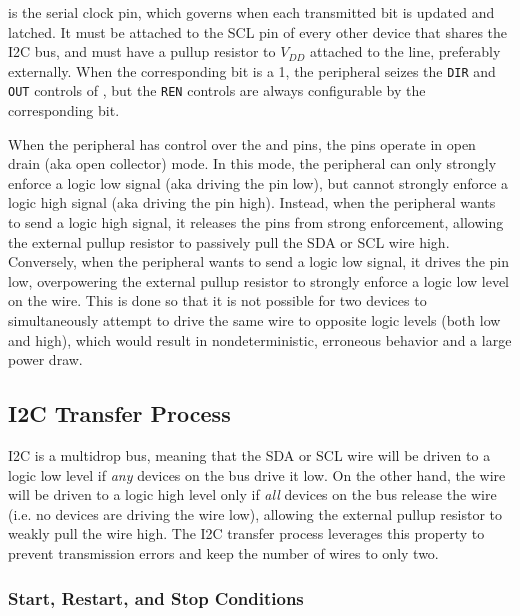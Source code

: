  is the serial clock pin, which governs when each transmitted bit is updated and latched. It must be attached to the SCL pin of every other device that shares the I2C bus, and must have a pullup resistor to $V_{DD}$ attached to the line, preferably externally. When the corresponding  bit is a 1, the  peripheral seizes the \texttt{DIR} and \texttt{OUT} controls of , but the \texttt{REN} controls are always configurable by the corresponding  bit.

When the  peripheral has control over the  and  pins, the pins operate in open drain (aka open collector) mode. In this mode, the  peripheral can only strongly enforce a logic low signal (aka driving the pin low), but cannot strongly enforce a logic high signal (aka driving the pin high). Instead, when the  peripheral wants to send a logic high signal, it releases the pins from strong enforcement, allowing the external pullup resistor to passively pull the SDA or SCL wire high. Conversely, when the  peripheral wants to send a logic low signal, it drives the pin low, overpowering the external pullup resistor to strongly enforce a logic low level on the wire. This is done so that it is not possible for two devices to simultaneously attempt to drive the same wire to opposite logic levels (both low and high), which would result in nondeterministic, erroneous behavior and a large power draw.



\subsection{I2C Transfer Process}

I2C is a multidrop bus, meaning that the SDA or SCL wire will be driven to a logic low level if \textit{any} devices on the bus drive it low. On the other hand, the wire will be driven to a logic high level only if \textit{all} devices on the bus release the wire (i.e. no devices are driving the wire low), allowing the external pullup resistor to weakly pull the wire high. The I2C transfer process leverages this property to prevent transmission errors and keep the number of wires to only two.

\subsubsection{Start, Restart, and Stop Conditions}


